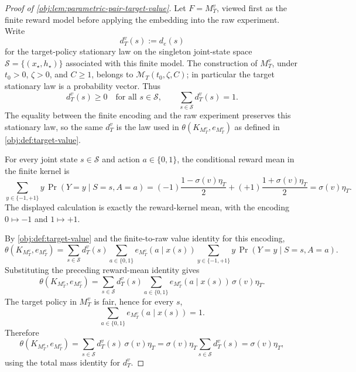 \begin{proof}[Proof of \cref{obj:lem:parametric-pair-target-value}]
Let \(F=M_T^v\), viewed first as the finite reward model before applying the embedding into the raw experiment.  Write
\[
d_T^v(s)
:=
d_e(s)
\]
for the target-policy stationary law on the singleton joint-state space \(\mathcal S=\{(x_\star,h_\star)\}\) associated with this finite model.  The construction of \(M_T^v\), under \(t_0>0\), \(\zeta>0\), and \(C\ge 1\), belongs to \(\mathcal M_T(t_0,\zeta,C)\); in particular the target stationary law is a probability vector.  Thus
\[
d_T^v(s)\ge 0
\quad\text{for all }s\in\mathcal S,
\qquad
\sum_{s\in\mathcal S}d_T^v(s)=1 .
\]
The equality between the finite encoding and the raw experiment preserves this stationary law, so the same \(d_T^v\) is the law used in \(\theta(K_{M_T^v},e_{M_T^v})\) as defined in \cref{obj:def:target-value}. %

For every joint state \(s\in\mathcal S\) and action \(a\in\{0,1\}\), the conditional reward mean in the finite kernel is
\[
\sum_{y\in\{-1,+1\}}
y\,\Pr(Y=y\mid S=s,A=a)
=
(-1)\frac{1-\sigma(v)\eta_T}{2}
+
(+1)\frac{1+\sigma(v)\eta_T}{2}
=
\sigma(v)\eta_T .
\]
The displayed calculation is exactly the reward-kernel mean, with the encoding \(0\mapsto -1\) and \(1\mapsto +1\). %

By \cref{obj:def:target-value} and the finite-to-raw value identity for this encoding,
\[
\theta(K_{M_T^v},e_{M_T^v})
=
\sum_{s\in\mathcal S}
d_T^v(s)
\sum_{a\in\{0,1\}}
e_{M_T^v}(a\mid x(s))
\sum_{y\in\{-1,+1\}}
y\,\Pr(Y=y\mid S=s,A=a).
\]
Substituting the preceding reward-mean identity gives
\[
\theta(K_{M_T^v},e_{M_T^v})
=
\sum_{s\in\mathcal S}
d_T^v(s)
\sum_{a\in\{0,1\}}
e_{M_T^v}(a\mid x(s))\,\sigma(v)\eta_T .
\]
The target policy in \(M_T^v\) is fair, hence for every \(s\),
\[
\sum_{a\in\{0,1\}}e_{M_T^v}(a\mid x(s))=1 .
\]
Therefore
\[
\theta(K_{M_T^v},e_{M_T^v})
=
\sum_{s\in\mathcal S}d_T^v(s)\,\sigma(v)\eta_T
=
\sigma(v)\eta_T\sum_{s\in\mathcal S}d_T^v(s)
=
\sigma(v)\eta_T ,
\]
using the total mass identity for \(d_T^v\). %
\end{proof}
